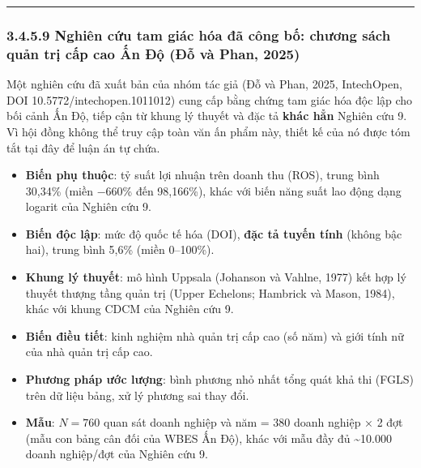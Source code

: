 \documentclass[
  a4paper,
  13pt]{extreport}
\providecommand{\tightlist}{%
  \setlength{\itemsep}{0pt}\setlength{\parskip}{0pt}}
\begin{document}
\begin{center}\rule{0.5\linewidth}{0.5pt}\end{center}

\hypertarget{nghiuxean-cux1ee9u-tam-giuxe1c-huxf3a-ux111uxe3-cuxf4ng-bux1ed1-chux1b0ux1a1ng-suxe1ch-quux1ea3n-trux1ecb-cux1ea5p-cao-ux1ea5n-ux111ux1ed9-ux111ux1ed7-vuxe0-phan-2025}{%
\subsubsection{3.4.5.9 Nghiên cứu tam giác hóa đã công bố: chương sách
quản trị cấp cao Ấn Độ (Đỗ và Phan,
2025)}\label{nghiuxean-cux1ee9u-tam-giuxe1c-huxf3a-ux111uxe3-cuxf4ng-bux1ed1-chux1b0ux1a1ng-suxe1ch-quux1ea3n-trux1ecb-cux1ea5p-cao-ux1ea5n-ux111ux1ed9-ux111ux1ed7-vuxe0-phan-2025}}

Một nghiên cứu đã xuất bản của nhóm tác giả (Đỗ và Phan, 2025,
IntechOpen, DOI 10.5772/intechopen.1011012) cung cấp bằng chứng tam giác
hóa độc lập cho bối cảnh Ấn Độ, tiếp cận từ khung lý thuyết và đặc tả
\textbf{khác hẳn} Nghiên cứu 9. Vì hội đồng không thể truy cập toàn văn
ấn phẩm này, thiết kế của nó được tóm tắt tại đây để luận án tự chứa.

\begin{itemize}
\tightlist
\item
  \textbf{Biến phụ thuộc}: tỷ suất lợi nhuận trên doanh thu (ROS), trung
  bình 30,34\% (miền −660\% đến 98,166\%), khác với biến năng suất lao
  động dạng logarit của Nghiên cứu 9.
\item
  \textbf{Biến độc lập}: mức độ quốc tế hóa (DOI), \textbf{đặc tả tuyến
  tính} (không bậc hai), trung bình 5,6\% (miền 0--100\%).
\item
  \textbf{Khung lý thuyết}: mô hình Uppsala (Johanson và Vahlne, 1977)
  kết hợp lý thuyết thượng tầng quản trị (Upper Echelons; Hambrick và
  Mason, 1984), khác với khung CDCM của Nghiên cứu 9.
\item
  \textbf{Biến điều tiết}: kinh nghiệm nhà quản trị cấp cao (số năm) và
  giới tính nữ của nhà quản trị cấp cao.
\item
  \textbf{Phương pháp ước lượng}: bình phương nhỏ nhất tổng quát khả thi
  (FGLS) trên dữ liệu bảng, xử lý phương sai thay đổi.
\item
  \textbf{Mẫu}: \(N = 760\) quan sát doanh nghiệp và năm = 380 doanh
  nghiệp × 2 đợt (mẫu con bảng cân đối của WBES Ấn Độ), khác với mẫu đầy
  đủ \textasciitilde10.000 doanh nghiệp/đợt của Nghiên cứu 9.
\end{itemize}
\end{document}
